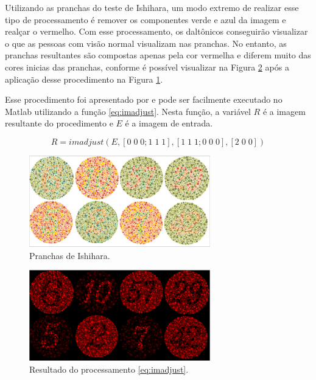 \documentclass[	12pt, Times, openright, twoside, a4paper, english, brazil]{abntex2}
\begin{document}
Utilizando as pranchas do teste de Ishihara, um modo extremo de realizar esse tipo de processamento é remover os componentes verde e azul da imagem e realçar o vermelho. Com esse processamento, os daltônicos conseguirão visualizar o que as pessoas com visão normal visualizam nas pranchas. No entanto, as pranchas resultantes são compostas apenas pela cor vermelha e diferem muito das cores inicias das pranchas, conforme é possível visualizar na Figura \ref{fig:figuraMatlab3} após a aplicação desse procedimento na Figura \ref{fig:figuraMatlab1}. 

Esse procedimento foi apresentado por  e pode ser facilmente executado no Matlab utilizando a função \ref{eq:imadjust}. Nesta função, a variável $R$ é a imagem resultante do procedimento e $E$ é a imagem de entrada.

\begin{equation}
R=imadjust (E,[0 \; 0 \; 0; 1 \; 1 \; 1],[1 \; 1 \; 1; 0 \; 0 \; 0],[2 \; 0 \; 0]) \label{eq:imadjust}
\end{equation}

\begin{figure}[!htb]
\centering \includegraphics[width=0.7\textwidth]{figuraMatlab1.PNG}
\caption{Pranchas de Ishihara. \label{fig:figuraMatlab1}}
\end{figure}

\begin{figure}[!htb]
\centering \includegraphics[width=0.7\textwidth]{figuraMatlab3.PNG}
\caption{Resultado do processamento \ref{eq:imadjust}. \label{fig:figuraMatlab3}}
\end{figure}
\end{document}
